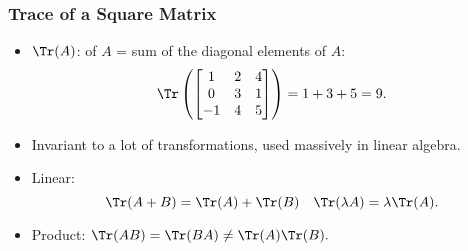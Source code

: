 \documentclass[8pt]{beamer}
\newcommand{\myemph}[1]{{\color{blue}{#1}}}
\begin{document}
\begin{frame}
  \frametitle{Trace of a Square Matrix}
  \begin{itemize}
  \item $\Tr(A)$: \myemph{Trace} of $A$ = sum of the diagonal elements of $A$:
    $$
    \Tr
    \left(\begin{bmatrix}
      1 & 2 & 4\\
      0 & 3 & 1\\
      -1& 4 & 5
    \end{bmatrix}
    \right) = 1 + 3 + 5 = 9.
    $$
  \item Invariant to a lot of transformations, used massively in linear algebra.
  \item Linear:
    $$
    \Tr(A+ B) = \Tr(A) + \Tr(B)\quad\Tr(\lambda A) = \lambda\Tr(A).
    $$
  \item Product: $\Tr(A B) = \Tr(B A) \not= \Tr(A)\Tr(B).$
   \end{itemize}
\end{frame}
\end{document}

